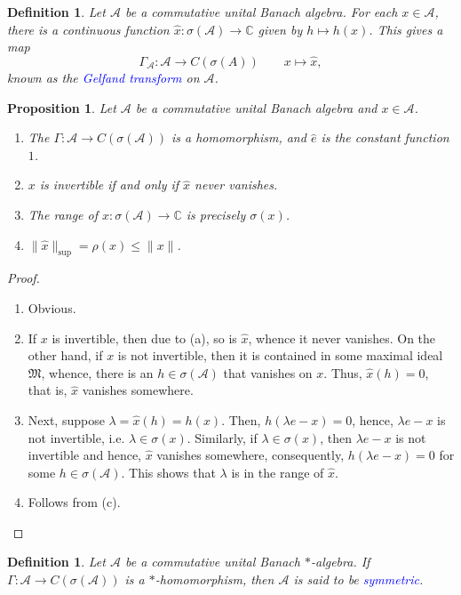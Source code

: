 \documentclass[11pt]{article}
\theoremstyle{thmstyle}
\newtheorem{proposition}[theorem]{Proposition}
\theoremstyle{defstyle}
\newtheorem{definition}[theorem]{Definition}
\newcommand{\bbC}{\mathbb{C}}
\newcommand{\calA}{\mathcal{A}} %
\newcommand{\frakM}{\mathfrak{M}} %
\newcommand{\wh}[1]{\widehat{#1}}
\newcommand{\define}[1]{\textcolor{blue}{\textit{#1}}}
\renewcommand{\le}{\leqslant}
\begin{document}
\begin{definition}
    Let $\calA$ be a commutative unital Banach algebra. For each $x\in\calA$, there is a continuous function $\wh x: \sigma(\calA)\to\bbC$ given by $h\mapsto h(x)$. This gives a map 
    \begin{equation*}
    \Gamma_\calA: \calA\to C(\sigma(A))\qquad x\mapsto\wh x,
    \end{equation*}
    known as the \define{Gelfand transform} on $\calA$.
\end{definition}

\begin{proposition}
    Let $\calA$ be a commutative unital Banach algebra and $x\in\calA$. 
    \begin{enumerate}[label=(\alph*)]
    \item The $\Gamma:\calA\to C(\sigma(\calA))$ is a homomorphism, and $\wh e$ is the constant function $1$. 
    \item $x$ is invertible if and only if $\wh x$ never vanishes. 
    \item The range of $\wh x: \sigma(\calA)\to\bbC$ is precisely $\sigma(x)$.
    \item $\|\wh x\|_{\sup} = \rho(x)\le\|x\|$.
    \end{enumerate}
\end{proposition}
\begin{proof}
\begin{enumerate}[label=(\alph*)]
\item Obvious.
\item If $x$ is invertible, then due to (a), so is $\wh x$, whence it never vanishes. On the other hand, if $x$ is not invertible, then it is contained in some maximal ideal $\frakM$, whence, there is an $h\in\sigma(\calA)$ that vanishes on $x$. Thus, $\wh x(h) = 0$, that is, $\wh x$ vanishes somewhere. 
\item Next, suppose $\lambda = \wh x(h) = h(x)$. Then, $h(\lambda e - x) = 0$, hence, $\lambda e - x$ is not invertible, i.e. $\lambda\in\sigma(x)$. Similarly, if $\lambda\in\sigma(x)$, then $\lambda e - x$ is not invertible and hence, $\wh x$ vanishes somewhere, consequently, $h(\lambda e - x) = 0$ for some $h\in\sigma(\calA)$. This shows that $\lambda$ is in the range of $\wh x$.
\item Follows from (c). \qedhere
\end{enumerate}
\end{proof}

\begin{definition}
    Let $\calA$ be a commutative unital Banach $\ast$-algebra. If $\Gamma:\calA\to C(\sigma(\calA))$ is a $\ast$-homomorphism, then $\calA$ is said to be \define{symmetric}.
\end{definition}
\end{document}
